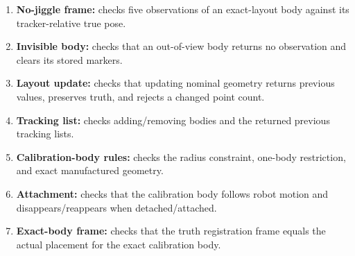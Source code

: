 \documentclass[11pt]{article}
\begin{document}
\begin{enumerate}
\item \textbf{No-jiggle frame:} checks five observations of an exact-layout body against its tracker-relative true pose.
\item \textbf{Invisible body:} checks that an out-of-view body returns no observation and clears its stored markers.
\item \textbf{Layout update:} checks that updating nominal geometry returns previous values, preserves truth, and rejects a changed point count.
\item \textbf{Tracking list:} checks adding/removing bodies and the returned previous tracking lists.
\item \textbf{Calibration-body rules:} checks the radius constraint, one-body restriction, and exact manufactured geometry.
\item \textbf{Attachment:} checks that the calibration body follows robot motion and disappears/reappears when detached/attached.
\item \textbf{Exact-body frame:} checks that the truth registration frame equals the actual placement for the exact calibration body.
\end{enumerate}
\end{document}
